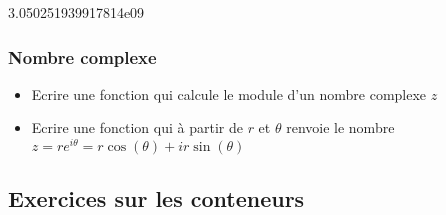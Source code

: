 \documentclass[letterpaper,10pt,english]{sphinxhowto}
\begin{document}
\begin{sphinxVerbatim}[commandchars=\\\{\}]
  
         

  
     
           
     

   
\end{sphinxVerbatim}

\begin{sphinxVerbatim}[commandchars=\\\{\}]
3.050251939917814e\PYGZhy{}09
\end{sphinxVerbatim}


\subsubsection{Nombre complexe}
\label{\detokenize{cours2_nombres_corr_exercices:nombre-complexe}}\begin{itemize}
\item {} 
\sphinxAtStartPar
Ecrire une fonction qui calcule le module d’un nombre complexe \(z\)

\item {} 
\sphinxAtStartPar
Ecrire une fonction qui à partir de \(r\) et \(\theta\) renvoie le nombre \(z = re^{i\theta} = r\cos(\theta) + ir\sin(\theta)\)

\end{itemize}


\subsection{Exercices sur les conteneurs}
\label{\detokenize{cours3_conteneur_corr_exercices:exercices-sur-les-conteneurs}}\label{\detokenize{cours3_conteneur_corr_exercices::doc}}
\end{document}
